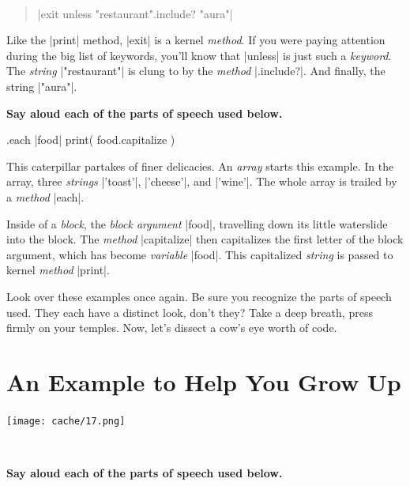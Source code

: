 \documentclass[12pt,twoside]{report}
\begin{document}
\pagebreak

\ 

\begin{quote}
\rubyinline|exit unless "restaurant".include? "aura"|\end{quote}


Like the \rubyinline|print| method,
\rubyinline|exit| is a kernel {\em method}.  If you
were paying attention during the big list of keywords, you'll know
that \rubyinline|unless| is just such a {\em keyword}.
The {\em string} \rubyinline|"restaurant"| is clung to
by the {\em method} \rubyinline|.include?|.  And
finally, the string \rubyinline|"aura"|.

{\bf Say aloud each of the parts of speech used below.}


\begin{rubycode}
  .each { |food|
    print( food.capitalize )
  }
\end{rubycode}

This caterpillar partakes of finer delicacies.  An {\em array} starts
this example.  In the array, three {\em strings}
\rubyinline|'toast'|,
\rubyinline|'cheese'|, and
\rubyinline|'wine'|.  The whole array is trailed by a
	   {\em method} \rubyinline|each|.

Inside of a {\em block}, the {\em block argument}
\rubyinline|food|, travelling down its little
waterslide into the block.  The {\em method}
\rubyinline|capitalize| then capitalizes the first
letter of the block argument, which has become {\em variable}
\rubyinline|food|.  This capitalized {\em string} is
passed to kernel {\em method} \rubyinline|print|.

Look over these examples once again.  Be sure you recognize the parts
of speech used.  They each have a distinct look, don't they?  Take a
deep breath, press firmly on your temples.  Now, let's dissect a cow's
eye worth of code.

\bigskip \bigskip \bigskip

\pagebreak


\section{An Example to Help You Grow Up}

	\texttt{[image: cache/17.png]}

\ %

{\bf Say aloud each of the parts of speech used below.}
\end{document}
